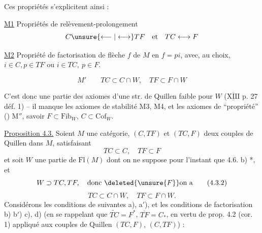 
Ces propriétés s'explicitent ainsi :

\uline{M1} Propriétés de relèvement-prolongement
\[
C\unsure{\longleftarrow|\longleftrightarrow}TF\quad\text{et}\quad TC\longleftrightarrow F
\]

\uline{M2} Propriété de factorisation de  flèche
$f$ de $M$ en $f=pi$, avec, au choix, $i\in C,p\in TF$
ou $i\in TC,\ p\in F$.

\[
M'\qquad TC\subset C\cap W,\quad TF\subset F\cap W
\]

C'est donc une partie des axiomes d'une
str. de Quillen faible  pour $W$
($\overline{\underline{\mathrm{XIII}}}$ p. 27 déf. 1) -- il manque les axiomes
de stabilité M3, M4, et les axiomes de
``propriété'' () M$''$, savoir $F\subset\mathrm{Fib}_W$, $C\subset\mathrm{Cof}_W$.

\uline{Proposition 4.3.} Soient $M$ une catégorie, $(C,TF)$ et
$(TC,F)$ deux couples de Quillen dans $M$, satisfaisant
\[
TC\subset C,\quad TF\subset F
\tag*{(4.3.1.)}
\]
et soit $W$ une partie de $\mathrm{Fl}(M)$ dont on ne
suppose pour l'instant que 4.6. b) *, et
\[
W\supset TC,TF,\quad\text{donc }\deleted{\unsure{F}}\text{on a}
\tag*{(4.3.2)}
\]
\[
TC\subset C\cap W,\quad TF\subset F\cap W.
\tag*{(4.3.3)}
\]
Considérons les conditions de   suivantes
a), a$'$), et les conditions de factorisation b) b$'$) c), d)
(en se rappelant que $\widetilde{TC}=F^*$, $\overline{TF}=C_*$, en
vertu de prop. 4.2 (cor. 1) appliqué aux couples de
Quillen $(TC,F)$, $(C,TF)$) :

